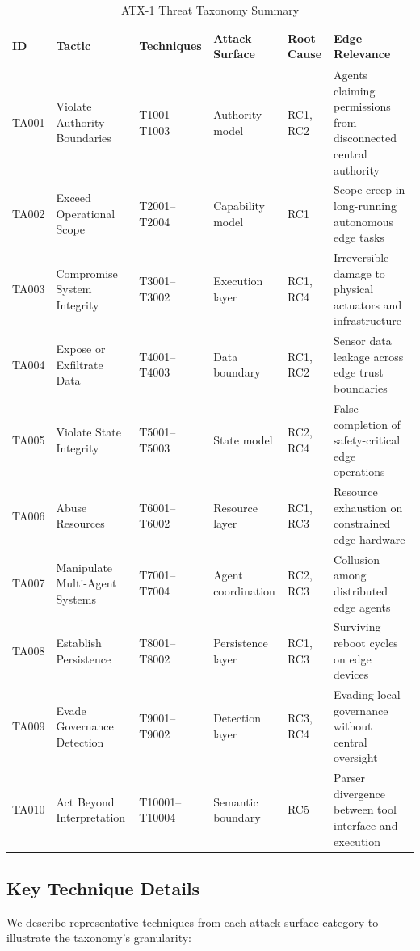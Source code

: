 \documentclass[journal]{IEEEtran}
\begin{document}
\begin{table}[t]
\centering
\caption{ATX-1 Threat Taxonomy Summary}
\label{tab:atx1}
\begin{tabularx}{\textwidth}{@{}l l l l l >{\raggedright\arraybackslash}X @{}}
\toprule
\textbf{ID} & \textbf{Tactic} & \textbf{Techniques} & \textbf{Attack Surface} & \textbf{Root Cause} & \textbf{Edge Relevance} \\
\midrule
TA001 & Violate Authority Boundaries & T1001--T1003 & Authority model & RC1, RC2 & Agents claiming permissions from disconnected central authority \\
TA002 & Exceed Operational Scope & T2001--T2004 & Capability model & RC1 & Scope creep in long-running autonomous edge tasks \\
TA003 & Compromise System Integrity & T3001--T3002 & Execution layer & RC1, RC4 & Irreversible damage to physical actuators and infrastructure \\
TA004 & Expose or Exfiltrate Data & T4001--T4003 & Data boundary & RC1, RC2 & Sensor data leakage across edge trust boundaries \\
TA005 & Violate State Integrity & T5001--T5003 & State model & RC2, RC4 & False completion of safety-critical edge operations \\
TA006 & Abuse Resources & T6001--T6002 & Resource layer & RC1, RC3 & Resource exhaustion on constrained edge hardware \\
TA007 & Manipulate Multi-Agent Systems & T7001--T7004 & Agent coordination & RC2, RC3 & Collusion among distributed edge agents \\
TA008 & Establish Persistence & T8001--T8002 & Persistence layer & RC1, RC3 & Surviving reboot cycles on edge devices \\
TA009 & Evade Governance Detection & T9001--T9002 & Detection layer & RC3, RC4 & Evading local governance without central oversight \\
TA010 & Act Beyond Interpretation & T10001--T10004 & Semantic boundary & RC5 & Parser divergence between tool interface and execution \\
\bottomrule
\end{tabularx}
\end{table}

\subsection{Key Technique Details}

We describe representative techniques from each attack surface category to illustrate the taxonomy's granularity:
\end{document}

